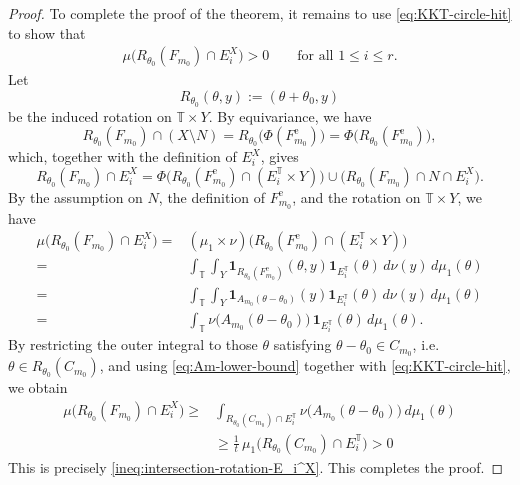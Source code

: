 \documentclass[11pt]{article}
\numberwithin{equation}{section}
\theoremstyle{remark}
\begin{document}
\begin{proof}
To complete the proof of the theorem, it remains to use \eqref{eq:KKT-circle-hit} to show that
\begin{align}\label{ineq:intersection-rotation-E_i^X}
        \mu\bigl(R_{\theta_0}(F_{m_0}) \cap E_i^X\bigr) > 0
    \qquad \text{for all } 1 \le i \le r.
\end{align}
Let 
\[
    R_{\theta_0}(\theta,y):=(\theta+\theta_0,y)
\]
be the induced rotation on $\mathbb{T}\times Y$. By equivariance, we have 
\[
    R_{\theta_0}(F_{m_0})\cap (X\setminus N)
    = R_{\theta_0}\big(\Phi(F_{m_0}^{\mathrm e})\big)
    = \Phi\big(R_{\theta_0}(F_{m_0}^{\mathrm e})\big),
\]
which, together with the definition of $E_i^X$, gives
\[
    R_{\theta_0}(F_{m_0})\cap E_i^X
    = \Phi\Big(R_{\theta_0}(F_{m_0}^{\mathrm e})\cap (E_i^\mathbb{T}\times Y)\Big)
        \cup \Big(R_{\theta_0}(F_{m_0})\cap N\cap E_i^X\Big).
\]
By the assumption on $N$, the definition of $F_{m_0}^{\mathrm e}$, and the rotation on $\mathbb{T}\times Y$, we have
\begin{align*}
    \mu\big(R_{\theta_0}(F_{m_0})\cap E_i^X\big)
    =& (\mu_1\times\nu)\big(R_{\theta_0}(F_{m_0}^{\mathrm e})\cap (E_i^\mathbb{T}\times Y)\big) \\
    = &\int_{\mathbb{T}}\int_Y 
        \mathbf{1}_{R_{\theta_0}(F_{m_0}^{\mathrm e})}(\theta,y)
        \mathbf{1}_{E_i^\mathbb{T}}(\theta)\,d\nu(y)\,d\mu_1(\theta) \\
    =& \int_{\mathbb{T}}\int_Y 
        \mathbf{1}_{A_{m_0}(\theta-\theta_0)}(y)\mathbf{1}_{E_i^\mathbb{T}}(\theta)
        \,d\nu(y)\,d\mu_1(\theta) \\
    =& \int_{\mathbb{T}} \nu\big(A_{m_0}(\theta-\theta_0)\big)\,\mathbf{1}_{E_i^\mathbb{T}}(\theta)\,d\mu_1(\theta).
\end{align*}
By restricting the outer integral to those $\theta$ satisfying 
$\theta-\theta_0\in C_{m_0}$, i.e.\ $\theta\in R_{\theta_0}(C_{m_0})$, and using \eqref{eq:Am-lower-bound} together with \eqref{eq:KKT-circle-hit}, we obtain
\begin{align*}
    \mu\big(R_{\theta_0}(F_{m_0})\cap E_i^X\big)
    \geq & \int_{R_{\theta_0}(C_{m_0})\cap E_i^\mathbb{T}} \nu\big(A_{m_0}(\theta-\theta_0)\big)\,d\mu_1(\theta) \\
    &\ge \frac1t\,\mu_1\big(R_{\theta_0}(C_{m_0})\cap E_i^\mathbb{T}\big)>0
\end{align*}
This is precisely \eqref{ineq:intersection-rotation-E_i^X}. This completes the proof.
\end{proof}
\end{document}
